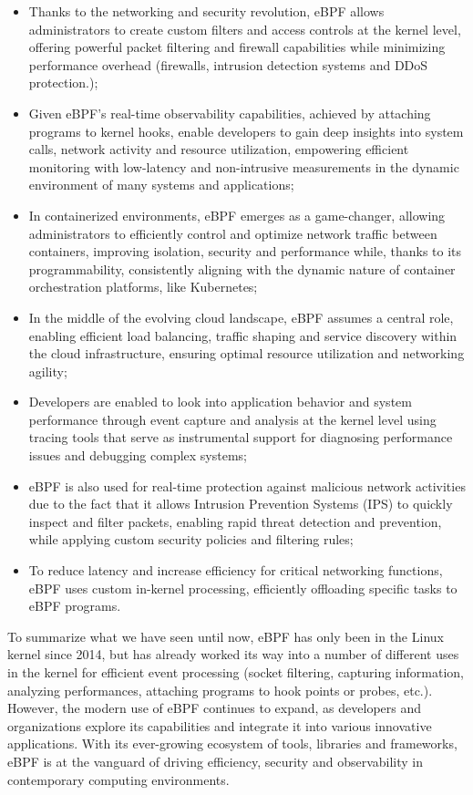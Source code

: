 \begin{itemize}
	\item 
		Thanks to the networking and security revolution, eBPF allows administrators to create custom filters and access controls at the kernel level, offering powerful packet filtering and firewall capabilities while minimizing performance overhead (firewalls, intrusion detection systems and DDoS protection.);
	\item 
		Given eBPF's real-time observability capabilities, achieved by attaching programs to kernel hooks, enable developers to gain deep insights into system calls, network activity and resource utilization, empowering efficient monitoring with low-latency and non-intrusive measurements in the dynamic environment of many systems and applications;
	\item 
		In containerized environments, eBPF emerges as a game-changer, allowing administrators to efficiently control and optimize network traffic between containers, improving isolation, security and performance while, thanks to its programmability, consistently aligning with the dynamic nature of container orchestration platforms, like Kubernetes;
	\item 
		In the middle of the evolving cloud landscape, eBPF assumes a central role, enabling efficient load balancing, traffic shaping and service discovery within the cloud infrastructure, ensuring optimal resource utilization and networking agility;
	\item 
		Developers are enabled to look into application behavior and system performance through event capture and analysis at the kernel level using tracing tools that serve as instrumental support for diagnosing	performance issues and debugging complex systems;
	\item 
		eBPF is also used for real-time protection against malicious network activities due to the fact that it allows Intrusion Prevention Systems (IPS) to quickly inspect and filter packets, enabling rapid threat detection and prevention, while applying custom security policies and filtering rules;
	\item 
		To reduce latency and increase efficiency for critical networking functions, eBPF uses custom in-kernel processing, efficiently offloading specific tasks to eBPF programs.
\end{itemize}

To summarize what we have seen until now, eBPF has only been in the Linux kernel since 2014, but has already worked its way into a number of different uses in the kernel for efficient event processing (socket filtering, capturing information, analyzing performances, attaching programs to hook points or probes, etc.). 
However, the modern use of eBPF continues to expand, as developers and organizations explore its capabilities and integrate it into various innovative applications. 
With its ever-growing ecosystem of tools, libraries and frameworks, eBPF is at the vanguard of driving efficiency, security and observability in contemporary computing environments.

